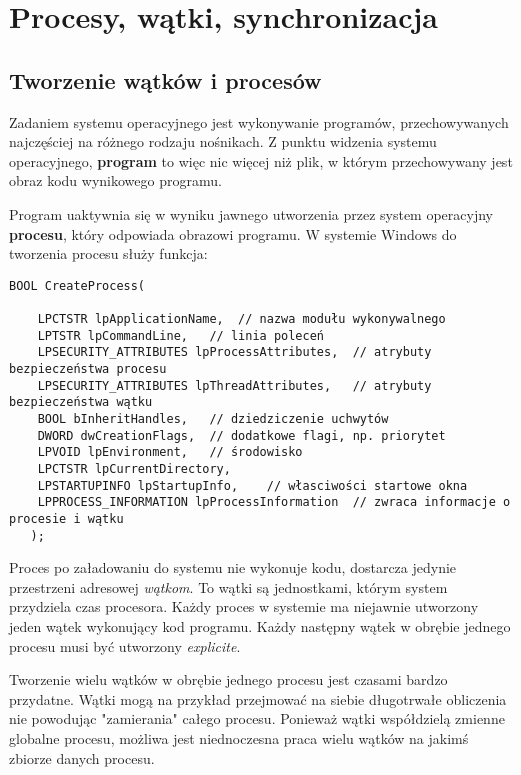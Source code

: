 ﻿\section{Procesy, wątki, synchronizacja}

\subsection{Tworzenie wątków i procesów}

Zadaniem systemu operacyjnego jest wykonywanie programów, przechowywanych najczęściej
na różnego rodzaju nośnikach. Z punktu widzenia systemu operacyjnego, {\bf program} to więc
nic więcej niż plik, w którym przechowywany jest obraz kodu wynikowego programu.

Program uaktywnia się w wyniku jawnego utworzenia przez system operacyjny {\bf procesu}, który
odpowiada obrazowi programu. W systemie Windows do tworzenia procesu służy funkcja:

\begin{scriptsize}
\begin{verbatim}
BOOL CreateProcess(

    LPCTSTR lpApplicationName,	// nazwa modułu wykonywalnego
    LPTSTR lpCommandLine,	// linia poleceń
    LPSECURITY_ATTRIBUTES lpProcessAttributes,	// atrybuty bezpieczeństwa procesu
    LPSECURITY_ATTRIBUTES lpThreadAttributes,	// atrybuty bezpieczeństwa wątku
    BOOL bInheritHandles,	// dziedziczenie uchwytów
    DWORD dwCreationFlags,	// dodatkowe flagi, np. priorytet
    LPVOID lpEnvironment,	// środowisko
    LPCTSTR lpCurrentDirectory,	
    LPSTARTUPINFO lpStartupInfo,	// własciwości startowe okna
    LPPROCESS_INFORMATION lpProcessInformation 	// zwraca informacje o procesie i wątku
   );
\end{verbatim}
\end{scriptsize}

Proces po załadowaniu do systemu nie wykonuje kodu, dostarcza jedynie przestrzeni adresowej {\em wątkom}.
To wątki są jednostkami, którym system przydziela czas procesora. Każdy proces w systemie ma niejawnie
utworzony jeden wątek wykonujący kod programu. Każdy następny wątek w obrębie jednego procesu musi
być utworzony {\em explicite}. 

Tworzenie wielu wątków w obrębie jednego procesu jest czasami bardzo przydatne. 
Wątki mogą na przykład przejmować na siebie długotrwałe obliczenia nie powodując "zamierania" całego
procesu. Ponieważ wątki współdzielą zmienne globalne procesu, możliwa jest niednoczesna praca wielu wątków na
jakimś zbiorze danych procesu. 

